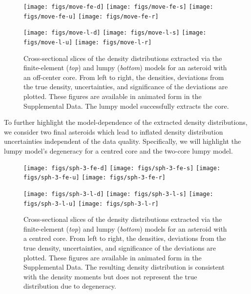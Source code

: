 \documentclass[fleqn,usenatbib]{mnras}
\begin{document}
\begin{figure}
  \texttt{[image: figs/move-fe-d]}\hfill
  \texttt{[image: figs/move-fe-s]}\hfill
  \texttt{[image: figs/move-fe-u]}\hfill
  \texttt{[image: figs/move-fe-r]}

  \texttt{[image: figs/move-l-d]}\hfill
  \texttt{[image: figs/move-l-s]}\hfill
  \texttt{[image: figs/move-l-u]}\hfill
  \texttt{[image: figs/move-l-r]}

  \caption{Cross-sectional slices of the density distributions extracted via the finite-element (\textit{top}) and lumpy (\textit{bottom}) models for an asteroid with an off-center core. From left to right, the densities, deviations from the true density, uncertainties, and significance of the deviations are plotted. These figures are available in animated form in the Supplemental Data. The lumpy model successfully extracts the core.}
  \label{fig:den-move}
\end{figure}

To further highlight the model-dependence of the extracted density distributions, we consider two final asteroids which lead to inflated density distribution uncertainties independent of the data quality. Specifically, we will highlight the lumpy model's degeneracy for a centred core and the two-core lumpy model.

\begin{figure}
  \texttt{[image: figs/sph-3-fe-d]}\hfill
  \texttt{[image: figs/sph-3-fe-s]}\hfill
  \texttt{[image: figs/sph-3-fe-u]}\hfill
  \texttt{[image: figs/sph-3-fe-r]}

  \texttt{[image: figs/sph-3-l-d]}\hfill
  \texttt{[image: figs/sph-3-l-s]}\hfill
  \texttt{[image: figs/sph-3-l-u]}\hfill
  \texttt{[image: figs/sph-3-l-r]}

  \caption{Cross-sectional slices of the density distributions extracted via the finite-element (\textit{top}) and lumpy (\textit{bottom}) models for an asteroid with a centred core. From left to right, the densities, deviations from the true density, uncertainties, and significance of the deviations are plotted. These figures are available in animated form in the Supplemental Data. The resulting density distribution is consistent with the density moments but does not represent the true distribution due to degeneracy.}
  \label{fig:den-sph}
\end{figure}
\end{document}
